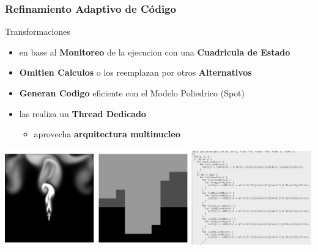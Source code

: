 \documentclass{beamer}\usetheme{Madrid} %
\begin{document}
\begin{frame}
\frametitle{Refinamiento Adaptivo de Código} 
\begin{block}{Transformaciones}
\begin{itemize}
	\item en base al \textbf{Monitoreo} de la ejecucion con una \textbf{Cuadricula de Estado}
	\item \textbf{Omitien Calculos} o los reemplazan por otros \textbf{Alternativos}
	\item \textbf{Generan Codigo} eficiente con el Modelo Poliedrico (Spot)
	\item las realiza un \textbf{Thread Dedicado} 
	\begin{itemize}
		\item aprovecha \textbf{arquitectura multinucleo} 
	\end{itemize}
\end{itemize}
\end{block}
\begin{center}
\includegraphics[scale=0.24]{img/ACR_pipeline.png}
\end{center}
\end{frame}
\end{document}

